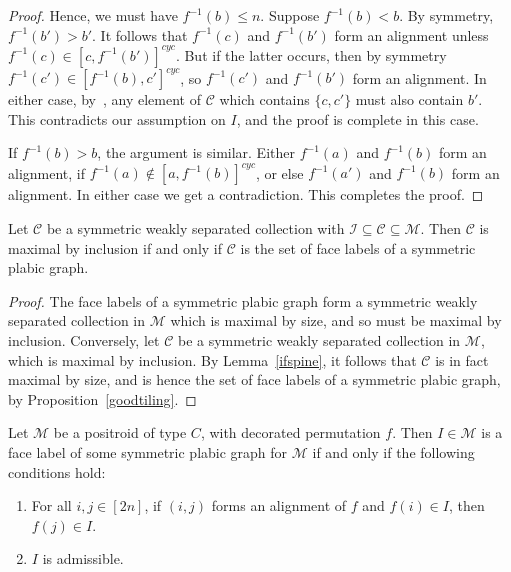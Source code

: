 \documentclass[ALCO,ThmDefs,Unicode,epreuves]{cedram}
\begin{document}
\begin{proof}
Hence, we must have $f^{-1}(b) \leq n$. 
Suppose $f^{-1}(b) < b$. By symmetry, $f^{-1}(b') > b'$. 
It follows that $f^{-1}(c)$ and $f^{-1}(b')$ form an alignment unless $ f^{-1}(c) \in [c, f^{-1}(b')]^{cyc}$. 
But if the latter occurs, then by symmetry $f^{-1}(c') \in [f^{-1}(b), c']^{cyc}$, so $f^{-1}(c')$ and $f^{-1}(b')$ form an alignment. In either case, by~\cite[Corollary 11.3]{OPS15}, any element of $\mathcal{C}$ which contains $\{c,c'\}$ must also contain $b'$. This contradicts our assumption on $I$, and the proof is complete in this case.

If $f^{-1}(b) > b$, the argument is similar. Either $f^{-1}(a)$ and $f^{-1}(b)$ form an alignment, if $f^{-1}(a) \not\in [a, f^{-1}(b)]^{cyc}$, or else $f^{-1}(a')$ and $f^{-1}(b)$ form an alignment. In either case we get a contradiction. This completes the proof. \end{proof}

\begin{theo}
\label{main}
Let $\mathcal{C}$ be a symmetric weakly separated collection with $\mathcal{I} \subseteq \mathcal{C} \subseteq \mathcal{M}$. Then $\mathcal{C}$ is maximal by inclusion if and only if $\mathcal{C}$ is the set of face labels of a symmetric plabic graph. 
\end{theo}

\begin{proof}
The face labels of a symmetric plabic graph form a symmetric weakly separated collection in $\mathcal{M}$ which is maximal by size, and so must be maximal by inclusion. Conversely, let $\mathcal{C}$ be a symmetric weakly separated collection in $\mathcal{M}$, which is maximal by inclusion. By Lemma~\ref{ifspine}, it follows that $\mathcal{C}$ is in fact maximal by size, and is hence the set of face labels of a symmetric plabic graph, by Proposition~\ref{goodtiling}.\end{proof} 

\begin{coro}Let $\mathcal{M}$ be a positroid of type $C$, with decorated permutation $f$. Then $I \in \mathcal{M}$ is a face label of some symmetric plabic graph for $\mathcal{M}$ if and only if the following conditions hold:
\begin{enumerate}
\item \label{ops_cor} For all $i,j \in [2n]$, if $(i,j)$ forms an alignment of $f$ and $f(i) \in I$, then $f(j) \in I$.
\item $I$ is admissible.
\end{enumerate}

\end{coro}
\end{document}
